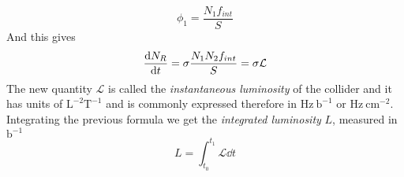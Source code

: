 \documentclass[../qm.tex]{subfiles}
\begin{document}
\begin{equation}
	\phi_1=\frac{N_1f_{int}}{S}
	\label{eq:fluxfreq}
\end{equation}
And this gives
\begin{equation}
	\dv{N_R}{t}=\sigma\frac{N_1N_2 f_{int}}{S}=\sigma\mathcal{L}
	\label{eq:instlum}
\end{equation}
The new quantity $\mathcal{L}$ is called the \emph{instantaneous luminosity} of the collider and it has units of $\mathrm{L^{-2}T^{-1}}$ and is commonly expressed therefore in $\mathrm{Hz\ b^{-1}}$ or $\mathrm{Hz\ cm^{-2}}$.\\
Integrating the previous formula we get the \emph{integrated luminosity} $L$, measured in $\mathrm{b^{-1}}$
\begin{equation*}
	L=\int_{t_0}^{t_1}\mathcal{L}\dd t
\end{equation*}
\end{document}
